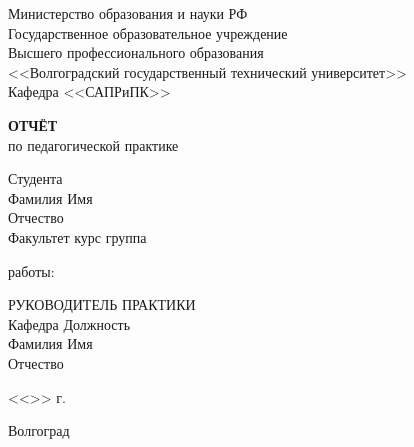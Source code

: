 \documentclass[a4paper, 14pt]{extreport}
\begin{document}
    \begin{titlepage}
        \begin{center}
            Министерство образования и науки РФ \\
            Государственное образовательное учреждение\\
            Высшего профессионального образования\\
            <<Волгоградский государственный технический университет>>\\
            Кафедра <<САПРиПК>>
        \end{center}
        \vspace{2.0cm}
        \begin{center}
            \large \textbf{ОТЧЁТ} \\
            по педагогической практике
        \end{center}
        \begin{flushleft}
            Студента\\
            Фамилия \underline{\hspace{5cm}} 
            Имя \underline{\hspace{5.1cm}}\\
            Отчество \underline{\hspace{5cm}}\\
            Факультет \underline{\hspace{4.8cm}} курс \underline{\hspace{2cm}} 
            группа \underline{\hspace{4cm}}\\
        \end{flushleft}
        \vspace{1.0cm}
         работы: \underline{\hspace{10cm}}
        \vspace{2.0cm}
        \begin{flushleft}
            РУКОВОДИТЕЛЬ ПРАКТИКИ\\
            Кафедра \underline{\hspace{5cm}} Должность \underline{\hspace{5cm}} \\
            Фамилия \underline{\hspace{4.9cm}} Имя \underline{\hspace{6.5cm}}\\
            Отчество \underline{\hspace{4.9cm}}
        \end{flushleft}
        \vspace{1.5cm}
        \begin{flushright}
            <<\underline{\hspace{1.0cm}}>>\underline{\hspace{4.0cm}} \the\year г.
        \end{flushright}
        \vspace{\fill}
        \begin{center}
            Волгоград \the\year
        \end{center}
    \end{titlepage}
    \tableofcontents
    \onehalfspacing
\end{document}
